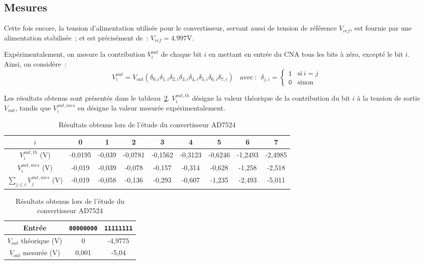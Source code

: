 \documentclass{article}
\begin{document}
\subsection{Mesures}


Cette fois encore, la tension d'alimentation utilisée pour le convertisseur, servant aussi de tension de référence $V_{ref}$, est fournie par une alimentation stabilisée~; et est précisément de~: ${V_{ref}=\mathrm{4.997 V}}$.



Expérimentalement, on mesure la contribution $V_i^{out}$ de chaque bit $i$ en mettant en entrée du CNA tous les bits à zéro, excepté le bit $i$. Ainsi, on considère~:
\begin{equation*}
V_i^{out} = V_{out}(\delta_{0,i}\delta_{1,i}\delta_{2,i}\delta_{3,i}\delta_{4,i}\delta_{5,i}\delta_{6,i}\delta_{7,i}) \mathrm{~~~~avec~:~~}\delta_{j,i} = \begin{cases} \mathtt{1} &\mathrm{si~} i=j \\ \mathtt{0} & \mbox{sinon}\end{cases}
\end{equation*}

Les résultats obtenus sont présentés dans le tableau~\ref{tab:AD7524}. $V_i^{out,th}$ désigne la valeur théorique de la contribution du bit $i$ à la tension de sortie $V_{out}$, tandis que $V_i^{out,mes}$ en désigne la valeur mesurée expérimentalement.



\begin{table}[h]
\caption{Résultats obtenus lors de l'étude du convertisseur AD7524}
\label{tab:AD7524}
\centering
\begin{tabular}{|c|c|c|c|c|c|c|c|c|}
\hline
$i$ & 0 & 1 & 2 & 3 & 4 & 5 & 6 & 7 \\
\hline
$V_i^{out,th}$ (V) & -0,0195 & -0,039 & -0,0781 & -0,1562 & -0,3123 & -0,6246 & -1,2493 & -2,4985 \\
\hline
$V_i^{out,mes}$ (V) & -0,019 & -0,039 & -0,078 & -0,157 & -0,314 & -0,628 & -1,258 & -2,518 \\
\hline
$\sum_{j\leq i}V_j^{out,mes}$ (V) & -0,019 & -0,058 & -0,136 & -0,293 & -0,607 & -1,235 & -2,493 & -5,011 \\
\hline
\end{tabular}

\vspace{10pt}
\begin{tabular}{|c|c|c|}
\hline
Entrée & \texttt{00000000} & \texttt{11111111} \\
\hline
$V_{out}$ théorique (V) & 0 & -4,9775 \\
\hline
$V_{out}$ mesurée (V) & 0,001 & -5,04 \\
\hline
\end{tabular}
\end{table}
\end{document}
